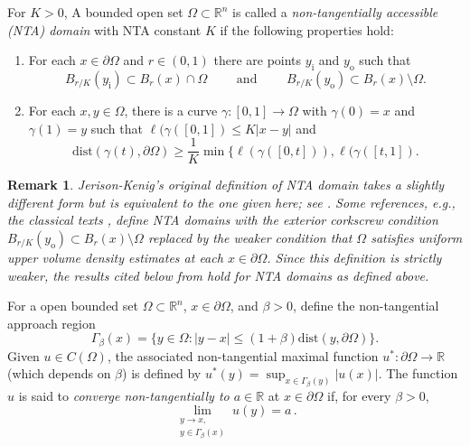 \documentclass[10pt, reqno]{amsart}
\numberwithin{equation}{section}
\newtheorem{remark}[theorem]{Remark}
\def\R{{\mathbb R}}
\def\W{\Omega}
\def\pa{{\partial}}
\begin{document}
For $K>0$,
A bounded open set $\W\subset \R^n$ is called a {\it non-tangentially accessible (NTA) domain}  with NTA constant $K$ if the following properties hold: 
\begin{enumerate}
    \item  For each $x \in \partial \W$ and $r \in (0,1)$ there are points $y_{\textrm{i}}$ and $y_{\textrm{o}}$ such that 
    \[
    B_{r/K}(y_{\textrm{i}}) \subset B_r(x) \cap \W  \qquad \text{ and } \qquad B_{r/K}(y_{\textrm{o}}) \subset B_r(x) \setminus \W .
    \]
    \item  For each  $x,y \in  \W$, there is a curve $\gamma : [0,1] \to \W$ with $\gamma(0)=x$ and $\gamma(1)=y$ such that $\ell(\gamma([0,1]) \leq K |x-y|$ and 
    $$\text{dist}(\gamma(t),\partial \W) \geq \frac{1}{K} \min\{ \ell(\gamma([0,t])), \ell(\gamma([t,1]).
    $$
\end{enumerate}
\begin{remark}
    {\rm 
    Jerison-Kenig's original definition of NTA domain  \cite{JKNTA} takes a slightly different form but is equivalent to the one given here; see \cite[Theorem 2.15]{ahmnt17}.
    Some references, e.g., the classical texts \cite{k94, CaffSalsa}, define NTA domains with the exterior corkscrew condition $B_{r/K}(y_{\textrm{o}}) \subset B_r(x) \setminus \W$ replaced by the weaker condition that $\Omega$ satisfies uniform upper volume density estimates at each $x\in \partial \W$. Since this definition is strictly weaker, the results cited below from \cite{k94}  hold for NTA domains as defined above. }
\end{remark}


For   a open bounded set $\W \subset \R^n$,  $x \in \partial \W$, and $\beta>0$, define the non-tangential approach region
\[
\Gamma_\beta(x)  = \{ y \in \W : |y-x| \leq (1+\beta) \text{dist}(y, \partial \W)\}.
\]
Given $u \in C(\Omega)$, the associated non-tangential maximal function $u^*:\pa \W \to \R$ (which depends on $\beta$) is defined by $u^*(y) = \sup_{x \in \Gamma_\beta(y)}|u(x)|$. The function $u$  is said to {\it converge non-tangentially to $a \in \R$} at $x \in \partial \Omega$ if, for every $\beta >0$, 
\begin{equation}\label{def: NTlimit 1}
\lim_{\substack{y \to x ,\\ 
y \in \Gamma_\beta(x)  }} u(y) = a\,.
\end{equation}
\end{document}
